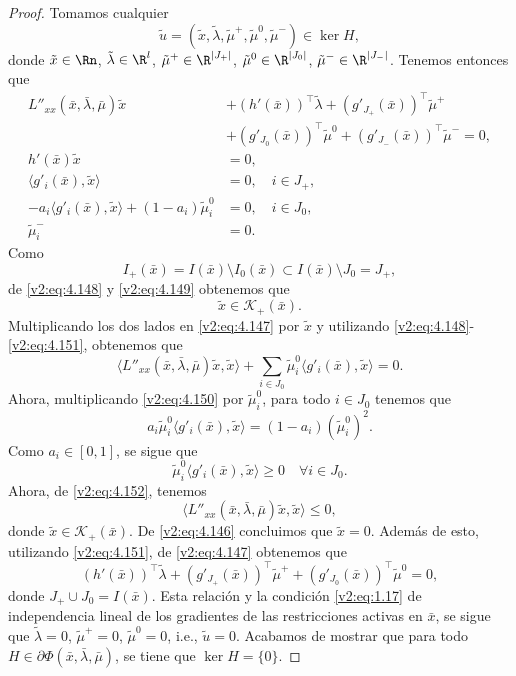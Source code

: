 \begin{proof}
    Tomamos cualquier
    \[
        \tilde{u} = (\tilde{x}, \tilde{\lambda}, \tilde{\mu}^+, \tilde{\mu}^0, \tilde{\mu}^-) \in \ker H,
    \]
    donde $\tilde{x} \in \Rn$, $\tilde{\lambda} \in \R^l$, $\tilde{\mu}^+ \in \R^{|J_+|}$, $\tilde{\mu}^0 \in \R^{|J_0|}$, $\tilde{\mu}^- \in \R^{|J_-|}$. Tenemos entonces que
    \begin{align}
        L''_{xx}(\bar{x}, \bar{\lambda}, \bar{\mu})\tilde{x} &+ (h'(\bar{x}))^\top \tilde{\lambda} + (g'_{J_+}(\bar{x}))^\top \tilde{\mu}^+ \nonumber \\
        &+ (g'_{J_0}(\bar{x}))^\top \tilde{\mu}^0 + (g'_{J_-}(\bar{x}))^\top \tilde{\mu}^- = 0, \label{v2:eq:4.147} \\
        h'(\bar{x})\tilde{x} &= 0, \label{v2:eq:4.148} \\
        \langle g'_i(\bar{x}), \tilde{x} \rangle &= 0, \quad i \in J_+, \label{v2:eq:4.149} \\
        -a_i \langle g'_i(\bar{x}), \tilde{x} \rangle + (1 - a_i)\tilde{\mu}^0_i &= 0, \quad i \in J_0, \label{v2:eq:4.150} \\
        \tilde{\mu}^-_i &= 0. \label{v2:eq:4.151}
    \end{align}
    Como
    \[
        I_+(\bar{x}) = I(\bar{x}) \setminus I_0(\bar{x}) \subset I(\bar{x}) \setminus J_0 = J_+,
    \]
    de \eqref{v2:eq:4.148} y \eqref{v2:eq:4.149} obtenemos que
    \[
        \tilde{x} \in \mathcal{K}_+(\bar{x}).
    \]
    Multiplicando los dos lados en \eqref{v2:eq:4.147} por $\tilde{x}$ y utilizando \eqref{v2:eq:4.148}-\eqref{v2:eq:4.151}, obtenemos que
    \begin{equation}
        \langle L''_{xx}(\bar{x}, \bar{\lambda}, \bar{\mu})\tilde{x}, \tilde{x} \rangle + \sum_{i \in J_0} \tilde{\mu}^0_i \langle g'_i(\bar{x}), \tilde{x} \rangle = 0.
        \label{v2:eq:4.152}
    \end{equation}
    Ahora, multiplicando \eqref{v2:eq:4.150} por $\tilde{\mu}^0_i$, para todo $i \in J_0$ tenemos que
    \[
        a_i \tilde{\mu}^0_i \langle g'_i(\bar{x}), \tilde{x} \rangle = (1 - a_i)(\tilde{\mu}^0_i)^2.
    \]
    Como $a_i \in [0, 1]$, se sigue que
    \[
        \tilde{\mu}^0_i \langle g'_i(\bar{x}), \tilde{x} \rangle \ge 0 \quad \forall i \in J_0.
    \]
    Ahora, de \eqref{v2:eq:4.152}, tenemos
    \[
        \langle L''_{xx}(\bar{x}, \bar{\lambda}, \bar{\mu})\tilde{x}, \tilde{x} \rangle \le 0,
    \]
    donde $\tilde{x} \in \mathcal{K}_+(\bar{x})$. De \eqref{v2:eq:4.146} concluimos que $\tilde{x} = 0$.
    Además de esto, utilizando \eqref{v2:eq:4.151}, de \eqref{v2:eq:4.147} obtenemos que
    \[
        (h'(\bar{x}))^\top \tilde{\lambda} + (g'_{J_+}(\bar{x}))^\top \tilde{\mu}^+ + (g'_{J_0}(\bar{x}))^\top \tilde{\mu}^0 = 0,
    \]
    donde $J_+ \cup J_0 = I(\bar{x})$.
    Esta relación y la condición \eqref{v2:eq:1.17} de independencia lineal de los gradientes de las restricciones activas en $\bar{x}$, se sigue que $\tilde{\lambda} = 0$, $\tilde{\mu}^+ = 0$, $\tilde{\mu}^0 = 0$, i.e., $\tilde{u} = 0$.
    Acabamos de mostrar que para todo $H \in \partial \Phi(\bar{x}, \bar{\lambda}, \bar{\mu})$, se tiene que $\ker H = \{0\}$.
\end{proof}

